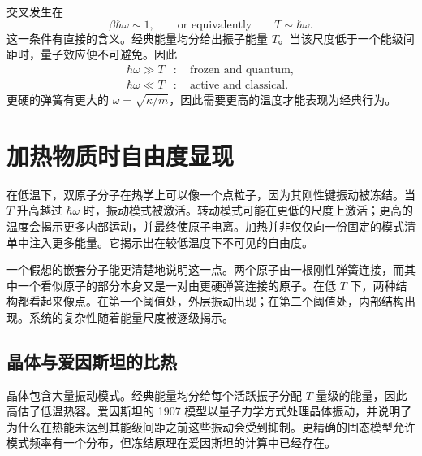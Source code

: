 交叉发生在
\begin{equation}
 \beta\hbar\omega\sim1,
 \qquad\text{or equivalently}\qquad
 T\sim\hbar\omega.
 \label{eq:sm7-crossover}
\end{equation}
这一条件有直接的含义。经典能量均分给出振子能量 \(T\)。当该尺度低于一个能级间距时，量子效应便不可避免。因此
\begin{equation}
\begin{aligned}
 \hbar\omega\gg T&:\quad \text{frozen and quantum},\\
 \hbar\omega\ll T&:\quad \text{active and classical}.
\end{aligned}
 \label{eq:sm7-regimes}
\end{equation}
更硬的弹簧有更大的 \(\omega=\sqrt{\kappa/m}\)，因此需要更高的温度才能表现为经典行为。

\section{加热物质时自由度显现}

在低温下，双原子分子在热学上可以像一个点粒子，因为其刚性键振动被冻结。当 \(T\) 升高越过 \(\hbar\omega\) 时，振动模式被激活。转动模式可能在更低的尺度上激活；更高的温度会揭示更多内部运动，并最终使原子电离。加热并非仅仅向一份固定的模式清单中注入更多能量。它揭示出在较低温度下不可见的自由度。

一个假想的嵌套分子能更清楚地说明这一点。两个原子由一根刚性弹簧连接，而其中一个看似原子的部分本身又是一对由更硬弹簧连接的原子。在低 \(T\) 下，两种结构都看起来像点。在第一个阈值处，外层振动出现；在第二个阈值处，内部结构出现。系统的复杂性随着能量尺度被逐级揭示。

\begin{classroomqa}
\end{classroomqa}

\subsection{晶体与爱因斯坦的比热}

晶体包含大量振动模式。经典能量均分给每个活跃振子分配 \(T\) 量级的能量，因此高估了低温热容。爱因斯坦的 1907 模型以量子力学方式处理晶体振动，并说明了为什么在热能未达到其能级间距之前这些振动会受到抑制。更精确的固态模型允许模式频率有一个分布，但冻结原理在爱因斯坦的计算中已经存在。

